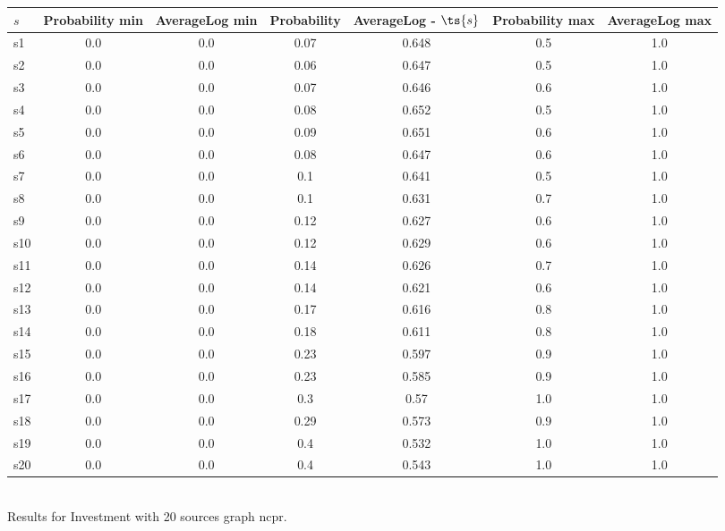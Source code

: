 \documentclass{article}
\begin{document}
\noindent\begin{tabular}{|l|c|c|c|c|c|c|}
\hline
$s$& Probability min & AverageLog min & Probability & AverageLog - $\ts{s}$ & Probability max & AverageLog max\\
\hline
s1 &0.0 & 0.0 & 0.07 & 0.648 & 0.5 & 1.0\\
\hline
s2 &0.0 & 0.0 & 0.06 & 0.647 & 0.5 & 1.0\\
\hline
s3 &0.0 & 0.0 & 0.07 & 0.646 & 0.6 & 1.0\\
\hline
s4 &0.0 & 0.0 & 0.08 & 0.652 & 0.5 & 1.0\\
\hline
s5 &0.0 & 0.0 & 0.09 & 0.651 & 0.6 & 1.0\\
\hline
s6 &0.0 & 0.0 & 0.08 & 0.647 & 0.6 & 1.0\\
\hline
s7 &0.0 & 0.0 & 0.1 & 0.641 & 0.5 & 1.0\\
\hline
s8 &0.0 & 0.0 & 0.1 & 0.631 & 0.7 & 1.0\\
\hline
s9 &0.0 & 0.0 & 0.12 & 0.627 & 0.6 & 1.0\\
\hline
s10 &0.0 & 0.0 & 0.12 & 0.629 & 0.6 & 1.0\\
\hline
s11 &0.0 & 0.0 & 0.14 & 0.626 & 0.7 & 1.0\\
\hline
s12 &0.0 & 0.0 & 0.14 & 0.621 & 0.6 & 1.0\\
\hline
s13 &0.0 & 0.0 & 0.17 & 0.616 & 0.8 & 1.0\\
\hline
s14 &0.0 & 0.0 & 0.18 & 0.611 & 0.8 & 1.0\\
\hline
s15 &0.0 & 0.0 & 0.23 & 0.597 & 0.9 & 1.0\\
\hline
s16 &0.0 & 0.0 & 0.23 & 0.585 & 0.9 & 1.0\\
\hline
s17 &0.0 & 0.0 & 0.3 & 0.57 & 1.0 & 1.0\\
\hline
s18 &0.0 & 0.0 & 0.29 & 0.573 & 0.9 & 1.0\\
\hline
s19 &0.0 & 0.0 & 0.4 & 0.532 & 1.0 & 1.0\\
\hline
s20 &0.0 & 0.0 & 0.4 & 0.543 & 1.0 & 1.0\\
\hline
\end{tabular}\\

\noindent Results for Investment with 20 sources graph ncpr.
\end{document}
